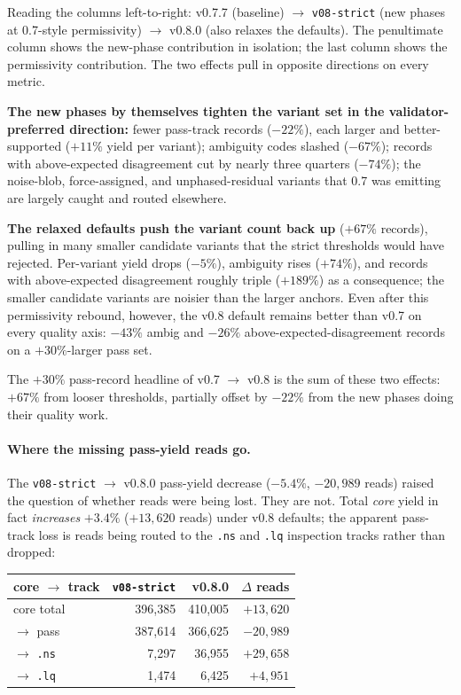 \documentclass[11pt]{article}
\begin{document}
Reading the columns left-to-right: v0.7.7 (baseline) $\to$
\texttt{v08-strict} (new phases at 0.7-style permissivity) $\to$
v0.8.0 (also relaxes the defaults). The penultimate column shows the
new-phase contribution in isolation; the last column shows the
permissivity contribution. The two effects pull in opposite directions
on every metric.

\textbf{The new phases by themselves tighten the variant set in the
validator-preferred direction:} fewer pass-track records ($-22\%$), each
larger and better-supported ($+11\%$ yield per variant); ambiguity codes
slashed ($-67\%$); records with above-expected disagreement cut by
nearly three quarters ($-74\%$); the noise-blob, force-assigned, and
unphased-residual variants that 0.7 was emitting are largely caught and
routed elsewhere.

\textbf{The relaxed defaults push the variant count back up} ($+67\%$
records), pulling in many smaller candidate variants that the strict
thresholds would have rejected. Per-variant yield drops ($-5\%$),
ambiguity rises ($+74\%$), and records with above-expected disagreement
roughly triple ($+189\%$) as a consequence; the smaller candidate
variants are noisier than the larger anchors. Even after this
permissivity rebound, however, the v0.8 default remains better than
v0.7 on every quality axis: $-43\%$ ambig and $-26\%$
above-expected-disagreement records on a $+30\%$-larger pass set.

The $+30\%$ pass-record headline of v0.7 $\to$ v0.8 is the sum of these
two effects: $+67\%$ from looser thresholds, partially offset by $-22\%$
from the new phases doing their quality work.

\paragraph{Where the missing pass-yield reads go.} The
\texttt{v08-strict} $\to$ v0.8.0 pass-yield decrease ($-5.4\%$,
$-20{,}989$ reads) raised the question of whether reads were being lost.
They are not. Total \emph{core} yield in fact \emph{increases} $+3.4\%$
($+13{,}620$ reads) under v0.8 defaults; the apparent pass-track loss is
reads being routed to the \texttt{.ns} and \texttt{.lq} inspection
tracks rather than dropped:

\begin{center}
\begin{tabular}{lrrr}
\toprule
core $\to$ track & \texttt{v08-strict} & v0.8.0 & $\Delta$ reads \\
\midrule
core total & 396,385 & 410,005 & $+13{,}620$ \\
$\to$ pass & 387,614 & 366,625 & $-20{,}989$ \\
$\to$ \texttt{.ns} & 7,297 & 36,955 & $+29{,}658$ \\
$\to$ \texttt{.lq} & 1,474 & 6,425 & $+4{,}951$ \\
\bottomrule
\end{tabular}
\end{center}
\end{document}
